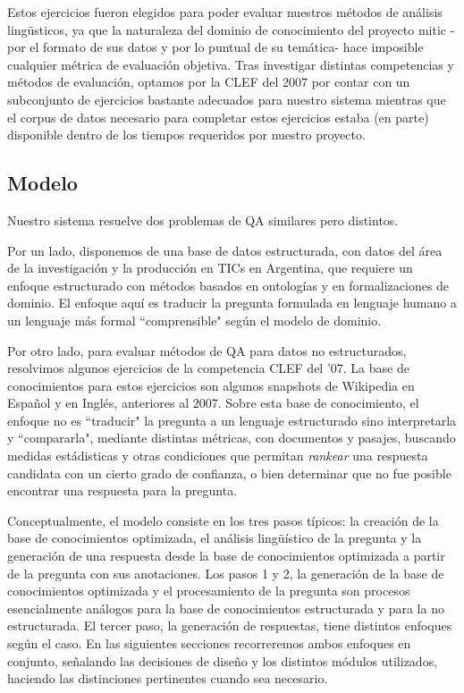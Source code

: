 Estos ejercicios fueron elegidos para poder evaluar nuestros m\'etodos de an\'alisis lingüsticos,
ya que la naturaleza del dominio de conocimiento del proyecto mitic - por el formato de sus datos
 y por lo puntual de su tem\'atica- hace imposible cualquier m\'etrica de evaluaci\'on objetiva.
Tras investigar distintas competencias y m\'etodos de evaluaci\'on, optamos por la CLEF del 2007
por contar con un subconjunto de ejercicios bastante adecuados para nuestro sistema mientras que el corpus
de datos necesario para completar estos ejercicios estaba (en parte) disponible dentro de los tiempos 
requeridos por nuestro proyecto. 

\bigskip

\subsection{Modelo}

Nuestro sistema resuelve dos problemas de QA similares pero distintos. 

Por un lado, disponemos de una base de datos estructurada, con datos del \'area de la investigaci\'on y la
producci\'on en TICs en Argentina, que requiere un enfoque estructurado con m\'etodos basados en ontolog\'ias y en 
formalizaciones de dominio. El enfoque aqu\'i es traducir la pregunta formulada en lenguaje humano a un lenguaje m\'as
formal ``comprensible" seg\'un el modelo de dominio. 

Por otro lado, para evaluar m\'etodos de QA 
para datos no estructurados, resolvimos algunos ejercicios de la competencia CLEF del '07. La base de conocimientos para
estos ejercicios son algunos snapshots de Wikipedia en Espa\~nol y en Ingl\'es, anteriores al 2007. Sobre esta base de conocimiento,
el enfoque no es ``traducir" la pregunta a un lenguaje estructurado sino interpretarla y ``compararla", mediante distintas m\'etricas, 
con documentos y pasajes, buscando medidas est\'adisticas y otras condiciones que permitan \textit{rankear} una respuesta candidata
con un cierto grado de confianza, o bien determinar que no fue posible encontrar una respuesta para la pregunta. 


Conceptualmente, el modelo consiste en los tres pasos t\'ipicos: la
creaci\'on de la base de conocimientos optimizada, el an\'alisis
ling\"u\'istico de la pregunta y la generaci\'on de una respuesta desde
la base de conocimientos optimizada a partir de la pregunta con sus
anotaciones. 
Los pasos 1 y 2, la generaci\'on de la base de conocimientos optimizada y el procesamiento de la pregunta son procesos
esencialmente análogos para la base de conocimientos estructurada y para la no estructurada. El tercer paso, la generaci\'on de respuestas,
tiene distintos enfoques seg\'un el caso. 
En las siguientes secciones recorreremos ambos enfoques en conjunto, señalando las decisiones de dise\~no y los distintos m\'odulos
utilizados, haciendo las distinciones pertinentes cuando sea necesario.

